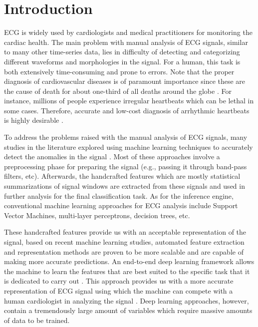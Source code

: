 \documentclass[10pt, conference, compsocconf]{IEEEtran}
\begin{document}
\IEEEpeerreviewmaketitle



\section{Introduction}
\label{sec:Introduction}
ECG is widely used by cardiologists and medical practitioners for monitoring the cardiac health. The main problem with manual analysis of ECG signals, similar to many other time-series data, lies in difficulty of detecting and categorizing different waveforms and morphologies in the signal. For a human, this task is both extensively time-consuming and prone to errors. Note that the proper diagnosis of cardiovascular diseases is of paramount importance since these are the cause of death for about one-third of all deaths around the globe \cite{who2018}.
For instance, millions of people experience irregular heartbeats which can be lethal in some cases. Therefore, accurate and low-cost diagnosis of arrhythmic heartbeats is highly desirable \cite{society2018}.

To address the problems raised with the manual analysis of ECG signals, many studies in the literature explored using machine learning techniques to accurately detect the anomalies in the signal \cite{esmaili2017nonlinear,dastjerdi2017non}. Most of these approaches involve a preprocessing phase for preparing the signal (e.g., passing it through band-pass filters, etc). Afterwards, the handcrafted features which are mostly statistical summarizations of signal windows are extracted from these signals and used in further analysis for the final classification task. As for the inference engine, conventional machine learning approaches for ECG analysis include Support Vector Machines, multi-layer perceptrons, decision trees, etc.
\cite{inan2006robust,sayadi2010robust,kachuee2017cuffless}

These handcrafted features provide us with an acceptable representation of the signal, based on recent machine learning studies, automated feature extraction and representation methods are proven to be more scalable and are capable of making more accurate predictions. An end-to-end deep learning framework allows the machine to learn the features that are best suited to the specific task that it is dedicated to carry out \cite{Acharya2017,Kiranyaz2016,Jin2017}. This approach provides us with a more accurate representation of ECG signal using which the machine can compete with a human cardiologist in analyzing the signal \cite{rajpurkar2017cardiologist}. Deep learning approaches, however, contain a tremendously large amount of variables which require massive amounts of data to be trained. 
\end{document}
